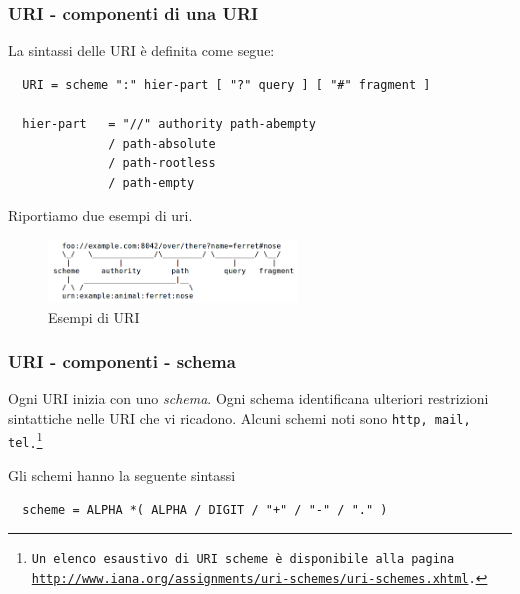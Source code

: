 \documentclass[8pt]{beamer}
\begin{document}
\begin{frame}[fragile]
	\frametitle{URI - componenti di una URI}
	
	La sintassi delle URI \`e definita come segue:
	
	\begin{verbatim}
  URI = scheme ":" hier-part [ "?" query ] [ "#" fragment ]

  hier-part   = "//" authority path-abempty
              / path-absolute
              / path-rootless
              / path-empty                  
	\end{verbatim}
	\vspace{\baselineskip}
	
	Riportiamo due esempi di uri.
	\vspace{\baselineskip}

	\begin{figure}
	    \includegraphics[width=250px]{imgs/uri-pieces.png}
	    \caption{Esempi di URI}
	\end{figure}
	
\end{frame}

\begin{frame}[fragile]
	\frametitle{URI - componenti - schema}
    Ogni URI inizia con uno \emph{schema}. Ogni schema identificana
    ulteriori restrizioni sintattiche nelle URI che vi ricadono.
    Alcuni schemi noti sono \tt{http}, \tt{mail}, \tt{tel}.\footnote{Un elenco
    esaustivo di URI scheme \`e disponibile alla pagina
    \url{http://www.iana.org/assignments/uri-schemes/uri-schemes.xhtml}.}
    \vspace{\baselineskip}
    
    Gli schemi hanno la seguente sintassi
    \begin{verbatim}
  scheme = ALPHA *( ALPHA / DIGIT / "+" / "-" / "." )
    \end{verbatim}    
\end{frame}
\end{document}
